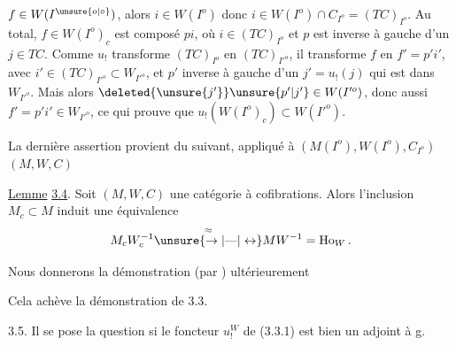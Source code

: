 
$f\in W(I^{\unsure{o|\circ}})$, alors $i\in W(I^o)$ donc $i\in W(I^o)\cap C_{I^o}=(TC)_{I^o}$.
Au total,  $f\in W(I^o)_c$ est composé $pi$,
où $i\in(TC)_{I^o}$ et $p$ est inverse à gauche
d'un $j\in TC$. Comme $u_!$ transforme
$(TC)_{I^o}$ en $(TC)_{I'^o}$, il transforme $f$
en $f'=p'i'$, avec $i'\in(TC)_{I'^o}\subset W_{I'^o}$,
et $p'$ inverse à gauche d'un $j'=u_!(j)$
qui est  dans $W_{I'^o}$. Mais alors
$\deleted{\unsure{j'}}\unsure{p'|j'}\in W(I'^o)$, donc aussi $f'=p'i'\in W_{I'^o}$,
ce qui prouve que $u_!(W(I^o)_c)\subset W(I'^o)$.

La dernière assertion provient du 
suivant, appliqué à $(M(I^o),W(I^o),C_{I^o})$  $(M,W,C)$

\uline{Lemme} \uline{3.4}. Soit $(M,W,C)$ une catégorie
à cofibrations. Alors l'inclusion $M_c\subset M$
induit une équivalence 
\[
M_c W_c^{-1}\overset{\approx}{\unsure{\to|\text{---}|\leftrightarrow}}MW^{-1}=\mathrm{Ho}_W\,.
\]

Nous donnerons la démonstration (par
) ultérieurement

Cela achève la démonstration de
3.3.

3.5. Il se pose la question si  le foncteur
$u_!^W$ de (3.3.1) est bien un adjoint à g.
